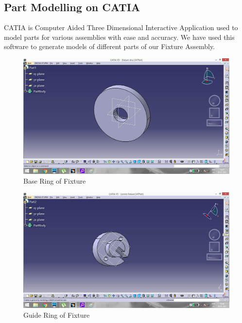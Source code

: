 \documentclass[16pt,a4paper]{article}
\begin{document}
\subsection{Part Modelling on CATIA}
CATIA is Computer Aided Three Dimensional Interactive Application used to model parts for various assemblies with ease and accuracy. We have used this software to generate models of different parts of our Fixture Assembly.

\begin{figure}[h]
\centering
\includegraphics[scale=0.3]{Base Ring of Fixture}
\caption{Base Ring of Fixture}
\label{fig:Base Ring of Fixture}
\end{figure}

\begin{figure}[h]
\centering
\includegraphics[scale=0.3]{Guide Ring of Fixture}
\caption{Guide Ring of Fixture}
\label{fig:Guide Ring of Fixture}
\end{figure}
\end{document}
